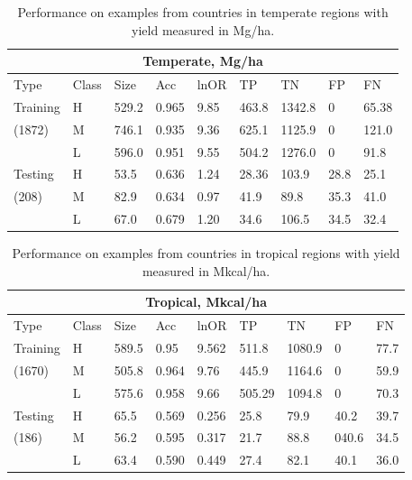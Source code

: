 \documentclass[12pt,twoside]{article}
\begin{document}
\begin{table}[h!]
\centering
\begin{tabular}{lllllllll}
\toprule
\multicolumn{9}{c}{\textbf{Temperate, Mg/ha}} \\
\midrule
Type & Class & Size & Acc & lnOR & TP & TN & FP & FN \\
\midrule
Training & H & 529.2 & 0.965 & 9.85 & 463.8 & 1342.8 & 0 & 65.38  \\
(1872) & M & 746.1 & 0.935 & 9.36 & 625.1 & 1125.9 & 0 & 121.0  \\
& L & 596.0 & 0.951 & 9.55 & 504.2 & 1276.0 & 0 & 91.8  \\
Testing & H & 53.5 & 0.636 & 1.24 & 28.36 & 103.9 & 28.8 & 25.1  \\
(208) & M & 82.9 & 0.634 & 0.97 & 41.9 & 89.8 & 35.3 & 41.0  \\
& L & 67.0 & 0.679 & 1.20 & 34.6 & 106.5 & 34.5 & 32.4  \\
\bottomrule
\end{tabular}
\captionsetup{width=.85\textwidth}
\caption[Performance on Temperate Data with Yield in Mg/ha]{Performance on examples from countries in temperate regions with yield measured in Mg/ha.}
\label{t.ny.temp_results}
\end{table}

\clearpage
\begin{table}[h!]
\centering
\begin{tabular}{lllllllll}
\toprule
\multicolumn{9}{c}{\textbf{Tropical, Mkcal/ha}} \\
\midrule
Type & Class & Size & Acc & lnOR & TP & TN & FP & FN \\
\midrule
Training & H & 589.5 & 0.95 & 9.562 & 511.8 & 1080.9 & 0 & 77.7  \\
(1670) & M & 505.8 & 0.964 & 9.76 & 445.9 & 1164.6 & 0 & 59.9  \\
& L & 575.6 & 0.958 & 9.66 & 505.29 & 1094.8 & 0 & 70.3  \\
Testing & H & 65.5 & 0.569 & 0.256 & 25.8 & 79.9 & 40.2 & 39.7  \\
(186) & M & 56.2 & 0.595 & 0.317 & 21.7 & 88.8 & 040.6 & 34.5  \\
& L & 63.4 & 0.590 & 0.449 & 27.4 & 82.1 & 40.1 & 36.0  \\
\bottomrule
\end{tabular}
\captionsetup{width=.85\textwidth}
\caption[Performance on Tropical Data with Yield in Mkcal/ha]{Performance on examples from countries in tropical regions with yield measured in Mkcal/ha.}
\label{k.ny.trop_results}
\end{table}
\end{document}

